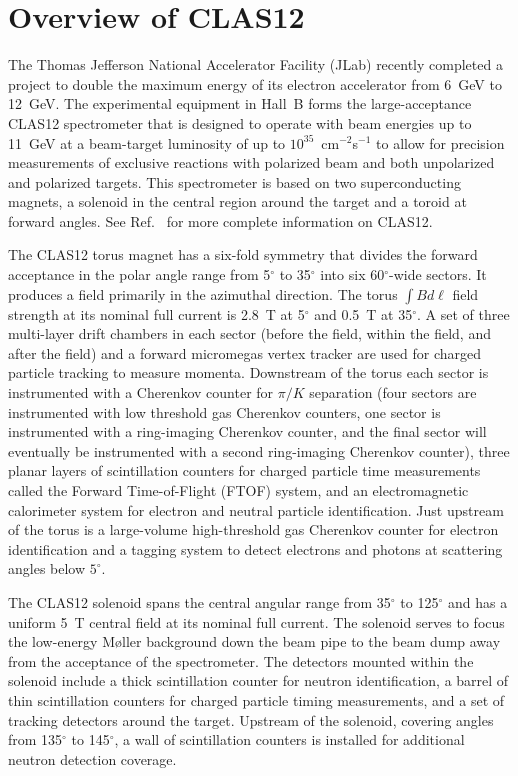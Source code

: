 \documentclass{elsart}
\begin{document}


\section{Overview of CLAS12}

The Thomas Jefferson National Accelerator Facility (JLab) recently completed a project to 
double the maximum energy of its electron accelerator from 6~GeV to 12~GeV. The experimental 
equipment in Hall~B forms the large-acceptance CLAS12 spectrometer that is designed to operate 
with beam energies up to 11~GeV at a beam-target luminosity of up to $10^{35}$~cm$^{-2}$s$^{-1}$
to allow for precision measurements of exclusive reactions with polarized beam and both unpolarized
and polarized targets. This spectrometer is based on two superconducting magnets, a solenoid in the
central region around the target and a toroid at forward angles. See Ref.~\cite{clas12-nim} for more
complete information on CLAS12.

The CLAS12 torus magnet has a six-fold symmetry that divides the forward acceptance in the polar angle
range from 5$^\circ$ to 35$^\circ$ into six 60$^\circ$-wide sectors. It produces a field primarily in
the azimuthal direction. The torus $\int \!B d\ell$ field strength at its nominal full current is 2.8~T
at 5$^\circ$ and 0.5~T at 35$^\circ$. A set of three multi-layer drift chambers in each sector (before
the field, within the field, and after the field) and a forward micromegas vertex tracker are used for
charged particle tracking to measure momenta. Downstream of the torus each sector is instrumented with
a Cherenkov counter for $\pi/K$ separation (four sectors are instrumented with low threshold gas Cherenkov
counters, one sector is instrumented with a ring-imaging Cherenkov counter, and the final sector will eventually
be instrumented with a second ring-imaging Cherenkov counter), three planar layers of scintillation counters
for charged particle time measurements called the Forward Time-of-Flight (FTOF) system, and an
electromagnetic calorimeter system for electron and neutral particle identification. Just upstream of the torus
is a large-volume high-threshold gas Cherenkov counter for electron identification and a tagging system to
detect electrons and photons at scattering angles below $5^\circ$.

The CLAS12 solenoid spans the central angular range from 35$^\circ$ to 125$^\circ$ and has a uniform
5~T central field at its nominal full current. The solenoid serves to focus the low-energy M{\o}ller
background down the beam pipe to the beam dump away from the acceptance of the spectrometer. The
detectors mounted within the solenoid include a thick scintillation counter for neutron identification, a
barrel of thin scintillation counters for charged particle timing measurements, and a set of tracking
detectors around the target. Upstream of the solenoid, covering angles from 135$^\circ$ to 145$^\circ$,
a wall of scintillation counters is installed for additional neutron detection coverage.
\end{document}
